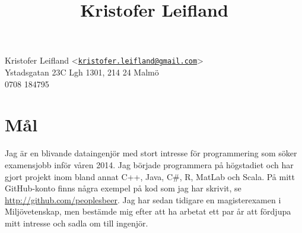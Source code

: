 \documentclass[10pt]{article}
\title{Kristofer Leifland}
\author{}
\date{}
\begin{document}
\maketitle
\thispagestyle{empty}
\pagestyle{empty}
\noindent
Kristofer Leifland <\href{mailto:kristofer.leifland@gmail.com}{\nolinkurl{kristofer.leifland@gmail.com}}>\\
Ystadsgatan 23C Lgh 1301, 214 24 Malmö\\
0708 184795\\

\section*{Mål}
Jag är en blivande dataingenjör med stort intresse för programmering som söker examensjobb inför våren 2014. Jag började programmera på högstadiet och har gjort projekt inom bland annat C++, Java, C\#, R, MatLab och Scala. På mitt GitHub-konto finns några exempel på kod som jag har skrivit, se \url{http://github.com/peoplesbeer}. Jag har sedan tidigare en magisterexamen i Miljövetenskap, men bestämde mig efter att ha arbetat ett par år att fördjupa mitt intresse och sadla om till ingenjör.
\end{document}
